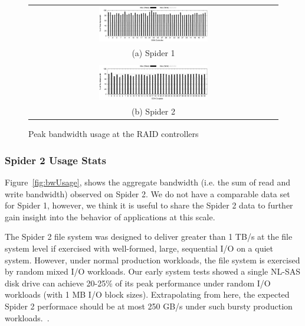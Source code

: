 \begin{figure}[!thb]
\begin{center}
\begin{tabular}{c}
{\includegraphics[width=0.450\textwidth]{./figs/spider1-bw-perc-max.eps}}\\
{(a) Spider 1}\\
\\
{\includegraphics[width=0.450\textwidth]{./figs/spider2-bw-perc-max.eps}}\\
{(b) Spider 2}\\
\end{tabular}
\vspace{-0.1in}
\caption{Peak bandwidth usage at the RAID controllers}
\label{fig:ddnpeakBW}
\end{center}
\end{figure}

\subsubsection{Spider 2 Usage Stats}

Figure~\ref{fig:bwUsage}, shows the aggregate bandwidth (i.e. the sum of read
and write bandwidth) observed on Spider 2. We do not have a comparable data set
for Spider 1, however, we think it is useful to share the Spider 2 data to further 
gain insight into the behavior of applications at this scale. 

The Spider 2 file system was designed to deliver greater than 1 TB/s at the file system level 
if exercised with well-formed, large, sequential I/O on a quiet system. However, under
normal production workloads, the file system is exercised by random mixed I/O
workloads. Our early system tests showed a single NL-SAS disk drive can achieve
20-25\% of its peak performance under random I/O workloads (with 1 MB I/O block
sizes). Extrapolating from here, the expected Spider 2 performace should be 
at most 250 GB/s under such bursty production workloads.~\cite{bestpractices}.

